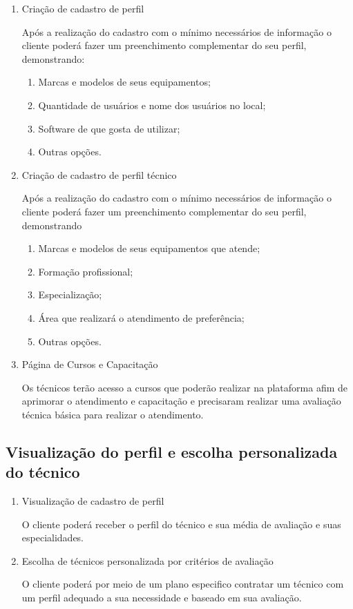 \documentclass[
    12pt,               %
    openright,          %
    oneside,
    a4paper,            %
    MODELO,             %
    english,            %
    brazil              %
   ]{ifsp-spo-inf-ctds}
\begin{document}
\begin{enumerate}
	\item Criação de cadastro de perfil
	
	Após a realização do cadastro com o mínimo necessários de informação o cliente poderá fazer um preenchimento complementar do seu perfil, demonstrando:
	
		\begin{enumerate}
		\item Marcas e modelos de seus equipamentos;
		\item Quantidade de usuários e nome dos usuários no local;
		\item Software de que gosta de utilizar;
		\item Outras opções.
		\end{enumerate}
	
	\item Criação de cadastro de perfil técnico
	
	Após a realização do cadastro com o mínimo necessários de informação o cliente poderá fazer um preenchimento complementar do seu perfil, demonstrando
	
		\begin{enumerate}
			
			\item Marcas e modelos de seus equipamentos que atende;
			\item Formação profissional;
			\item Especialização;
			\item Área que realizará o atendimento de preferência;
			\item Outras opções. 
			
		\end{enumerate}
	
	\item Página de Cursos e Capacitação
	
		Os técnicos terão acesso a cursos que poderão realizar na plataforma afim de aprimorar o atendimento e capacitação e precisaram realizar uma avaliação técnica básica para realizar o atendimento.
	
\end{enumerate}

\subsection{Visualização do perfil e escolha personalizada do técnico}

\begin{enumerate}
	
	\item Visualização de cadastro de perfil
	
	O cliente poderá receber o perfil do técnico e sua média de avaliação e suas especialidades.
	
	\item Escolha de técnicos personalizada por critérios de avaliação
	
	O cliente poderá por meio de um plano especifico contratar um técnico com um perfil adequado a sua necessidade e baseado em sua avaliação.
	
\end{enumerate}
\end{document}
